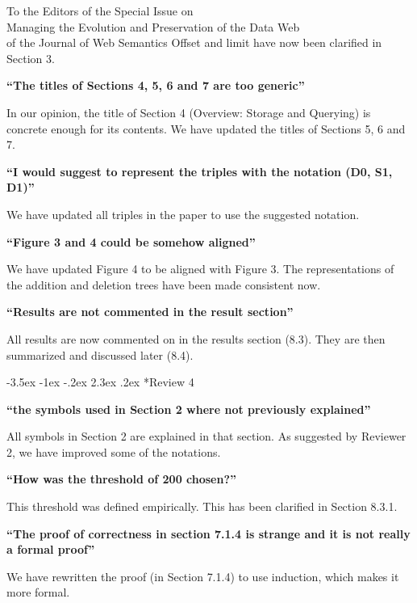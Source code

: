 \documentclass{letter}
\makeatletter
\newcounter{section}
\newcommand\section{\@startsection {section}{1}{\z@}%
                                   {-3.5ex \@plus -1ex \@minus -.2ex}%
                                   {2.3ex \@plus.2ex}%
                                   {\normalfont\Large\bfseries}}
\makeatother
\begin{document}
\begin{letter}{To the Editors of the Special Issue on\\Managing the Evolution and Preservation of the Data Web\\of the Journal of Web Semantics}
Offset and limit have now been clarified in Section 3.

\textbf{\enquote{The titles of Sections 4, 5, 6 and 7 are too generic}}

In our opinion, the title of Section 4 (Overview: Storage and Querying) is concrete enough for its contents.
We have updated the titles of Sections 5, 6 and 7.

\textbf{\enquote{I would suggest to represent the triples with the notation (D0, S1, D1)}}

We have updated all triples in the paper to use the suggested notation.

\textbf{\enquote{Figure 3 and 4 could be somehow aligned}}

We have updated Figure 4 to be aligned with Figure 3.
The representations of the addition and deletion trees have been made consistent now.

\textbf{\enquote{Results are not commented in the result section}}

All results are now commented on in the results section (8.3).
They are then summarized and discussed later (8.4).

\section*{Review 4}

\textbf{\enquote{the symbols used in Section 2 where not previously explained}}

All symbols in Section 2 are explained in that section.
As suggested by Reviewer 2, we have improved some of the notations.

\textbf{\enquote{How was the threshold of 200 chosen?}}

This threshold was defined empirically.
This has been clarified in Section 8.3.1.

\textbf{\enquote{The proof of correctness in section 7.1.4 is strange and it is not really a formal proof}}

We have rewritten the proof (in Section 7.1.4) to use induction, which makes it more formal.

\end{letter}
\end{document}
